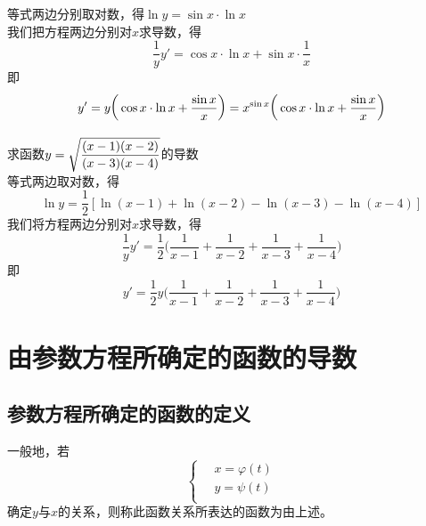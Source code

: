\solve 等式两边分别取对数，得$\ln y=\sin x\cdot \ln x$\\[0.5em]
我们把方程两边分别对$x$求导数，得
\begin{equation}
	\nonumber
\frac{1}{y}y'=\cos x\cdot \ln x+\sin x\cdot \frac{1}{x}
\end{equation}
即\begin{equation}
	\nonumber
	y'=y\bigg(\cos x\cdot \ln x+\frac{\sin x}{x}\bigg)=x^{\sin x}\bigg(\cos x\cdot \ln x+\frac{\sin x}{x}\bigg)
	\vspace*{1.5em}
\end{equation}

\noindent \examples 求函数$y=\sqrt{\displaystyle\frac{(x-1)(x-2)}{(x-3)(x-4)}}$的导数
\\ \solve 等式两边取对数，得
\sj
\begin{equation}
	\nonumber
	\ln y=\frac{1}{2}[\ln(x-1)+\ln(x-2)-\ln(x-3)-\ln(x-4)]
\end{equation}
我们将方程两边分别对$x$求导数，得
\begin{equation}
	\nonumber
	\frac{1}{y}y'=\frac{1}{2}\bigg(\frac{1}{x-1}+\frac{1}{x-2}+\frac{1}{x-3}+\frac{1}{x-4}\bigg)
\end{equation}
即\begin{equation}
	\nonumber
	y'=\frac{1}{2}y\bigg(\frac{1}{x-1}+\frac{1}{x-2}+\frac{1}{x-3}+\frac{1}{x-4}\bigg)
\end{equation}
\section{由参数方程所确定的函数的导数}
\subsection{参数方程所确定的函数的定义}
一般地，若
\begin{equation}
	\left\{ \begin{aligned}
		&\, x=\varphi(t)\\
		&\, y=\psi (t)\\
	\end{aligned}\right.
\end{equation}
确定$y$与$x$的关系，则称此函数关系所表达的函数为由上述。
